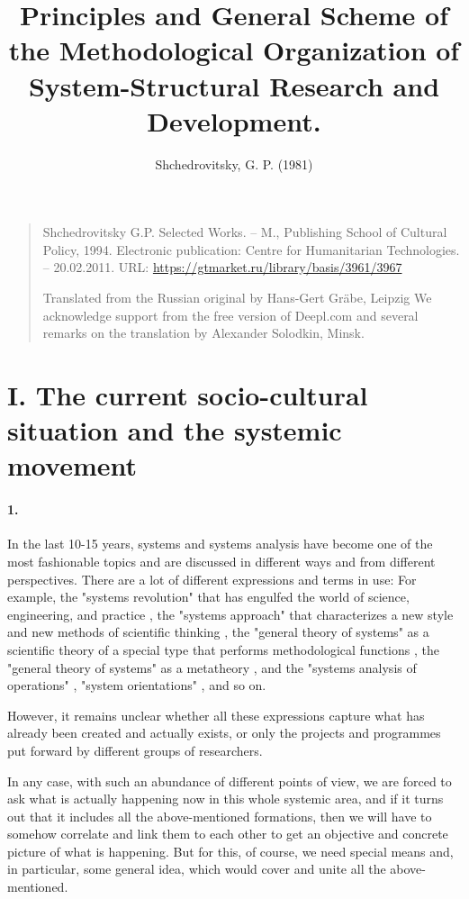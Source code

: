 \documentclass[11pt,a4paper]{article}
\title{Principles and General Scheme of the Methodological Organization of
  System-Structural Research and Development.  }
\author{Shchedrovitsky, G. P. (1981)}
\begin{document}
\maketitle
\begin{quote}  
  Shchedrovitsky G.P. Selected Works. – M., Publishing School of Cultural
  Policy, 1994.  Electronic publication: Centre for Humanitarian Technologies. –
  20.02.2011.  URL: \url{https://gtmarket.ru/library/basis/3961/3967}

  Translated from the Russian original by Hans-Gert Gräbe, Leipzig We
  acknowledge support from the free version of Deepl.com and several remarks
  on the translation by Alexander Solodkin, Minsk.
\end{quote}

\section*{I. The current socio-cultural situation and the systemic movement} 

\paragraph{1.}
In the last 10-15 years, systems and systems analysis have become one of the
most fashionable topics and are discussed in different ways and from different
perspectives. There are a lot of different expressions and terms in use: For
example, the "systems revolution" that has engulfed the world of science,
engineering, and practice \cite{Ackoff1971, Ackoff1972}, the "systems
approach" that characterizes a new style and new methods of scientific
thinking \cite{Blauberg1969, Blauberg1973}, the "general theory of systems" as
a scientific theory of a special type that performs methodological functions
\cite{GTS1966, Zadeh1970, Mesarovich1973, Uemov1978}, the "general theory of
systems" as a metatheory \cite{Trends1972, Sadovsky1974}, and the "systems
analysis of operations" \cite{Quaid1969, Otdel1974, Optner1969}, "system
orientations" \cite{Yudin1972}, and so on.

However, it remains unclear whether all these expressions capture what has
already been created and actually exists, or only the projects and programmes
put forward by different groups of researchers.

In any case, with such an abundance of different points of view, we are forced
to ask what is actually happening now in this whole systemic area, and if it
turns out that it includes all the above-mentioned formations, then we will
have to somehow correlate and link them to each other to get an objective and
concrete picture of what is happening. But for this, of course, we need
special means and, in particular, some general idea, which would cover and
unite all the above-mentioned.
\end{document}
